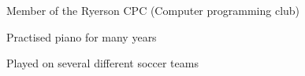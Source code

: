 
\begin{cventries}
    \cventry
    {}
    {}
    {}
    {}
    {
        \begin{cvitems}
            \item {Member of the Ryerson CPC (Computer programming club)}
            \item {Practised piano for many years}
            \item {Played on several different soccer teams}
        \end{cvitems}
    }
\end{cventries}


